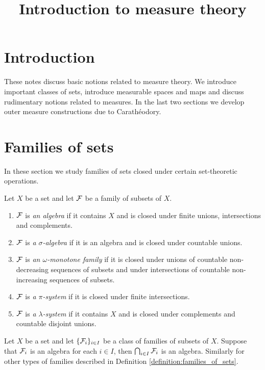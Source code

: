 



\title{Introduction to measure theory}
\date{}
\maketitle

\section{Introduction}
\noindent
These notes discuss basic notions related to measure theory. We introduce important classes of sets, introduce measurable spaces and maps and discuss rudimentary notions related to measures. In the last two sections we develop outer measure constructions due to Carath{\'e}odory.

\section{Families of sets}
\noindent
In these section we study families of sets closed under certain set-theoretic operations.

\begin{definition}\label{definition:families_of_sets}
    Let $X$ be a set and let ${\mathcal F}$ be a family of subsets of $X$.
    \begin{enumerate}[label=\textbf{(\arabic*)}, leftmargin=*]
        \item ${\mathcal F}$ is \textit{an algebra} if it contains $X$ and is closed under finite unions, intersections and complements.
        \item ${\mathcal F}$ is \textit{a $\sigma$-algebra} if it is an algebra and is closed under countable unions.
        \item ${\mathcal F}$ is \textit{an $\omega$-monotone family} if it is closed under unions of countable non-decreasing sequences of subsets and under intersections of countable non-increasing sequences of subsets.
        \item ${\mathcal F}$ is \textit{a $\pi$-system} if it is closed under finite intersections.
        \item ${\mathcal F}$ is \textit{a $\lambda$-system} if it contains $X$ and is closed under complements and countable disjoint unions.
    \end{enumerate}
\end{definition}

\begin{remark}\label{remark:intersections}
    Let $X$ be a set and let $\{{\mathcal F}_i\}_{i\in I}$ be a class of families of subsets of $X$. Suppose that ${\mathcal F}_i$ is an algebra for each $i \in I$, then $\bigcap_{i\in I}{\mathcal F}_i$ is an algebra. Similarly for other types of families described in Definition \ref{definition:families_of_sets}.
\end{remark}

